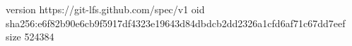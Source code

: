 version https://git-lfs.github.com/spec/v1
oid sha256:e6f82b90e6cb9f5917df4323e19643d84dbdcb2dd2326a1cfd6af71c67dd7eef
size 524384
